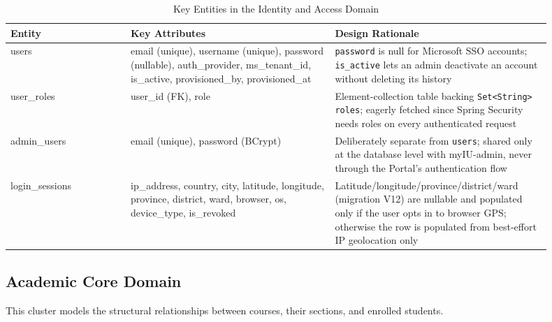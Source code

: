 \documentclass[12pt,a4paper]{report}
\begin{document}
\begin{longtable}{@{}p{0.20\linewidth}p{0.34\linewidth}p{0.36\linewidth}@{}}
\caption{Key Entities in the Identity and Access Domain}\\
\toprule
\textbf{Entity} & \textbf{Key Attributes} & \textbf{Design Rationale} \\
\midrule
\endhead
users & email (unique), username (unique), password (nullable), auth\_provider, ms\_tenant\_id, is\_active, provisioned\_by, provisioned\_at &
  \texttt{password} is null for Microsoft SSO accounts; \texttt{is\_active} lets an admin deactivate an account without deleting its history \\
user\_roles & user\_id (FK), role &
  Element-collection table backing \texttt{Set<String> roles}; eagerly fetched since Spring Security needs roles on every authenticated request \\
admin\_users & email (unique), password (BCrypt) &
  Deliberately separate from \texttt{users}; shared only at the database level with myIU-admin, never through the Portal's authentication flow \\
login\_sessions & ip\_address, country, city, latitude, longitude, province, district, ward, browser, os, device\_type, is\_revoked &
  Latitude/longitude/province/district/ward (migration V12) are nullable and populated only if the user opts in to browser GPS; otherwise the row is populated from best-effort IP geolocation only \\
\bottomrule
\end{longtable}

\subsection{Academic Core Domain}

This cluster models the structural relationships between courses,
their sections, and enrolled students.
\end{document}
